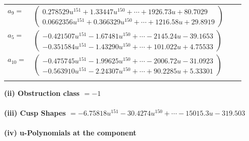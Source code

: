 \documentclass[1p]{elsarticle_modified}
\theoremstyle{definition}
\begin{document}
\begin{tabular}{m{7pt} m{180pt} m{7pt} m{180pt} }
\flushright $a_{9}=$&$\begin{pmatrix}0.278529 u^{151}+1.33447 u^{150}+\cdots+1926.73 u+80.7029\\0.0662356 u^{151}+0.366329 u^{150}+\cdots+1216.58 u+29.8919\end{pmatrix}$ \\
\flushright $a_{5}=$&$\begin{pmatrix}-0.421507 u^{151}-1.67481 u^{150}+\cdots-2145.24 u-39.1653\\-0.351584 u^{151}-1.43290 u^{150}+\cdots+101.022 u+4.75533\end{pmatrix}$ \\
\flushright $a_{10}=$&$\begin{pmatrix}-0.475745 u^{151}-1.99625 u^{150}+\cdots-2006.72 u-31.0923\\-0.563910 u^{151}-2.24307 u^{150}+\cdots+90.2285 u+5.33301\end{pmatrix}$\\&\end{tabular}
\flushleft \textbf{(ii) Obstruction class $= -1$}\\~\\
\flushleft \textbf{(iii) Cusp Shapes $= -6.75818 u^{151}-30.4274 u^{150}+\cdots-15015.3 u-319.503$}\\~\\
\newpage\renewcommand{\arraystretch}{1}
\flushleft \textbf{(iv) u-Polynomials at the component}\newline \\
\end{document}
